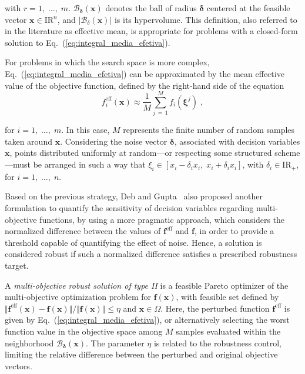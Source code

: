 \documentclass[final,5p,times,twocolumn,numbers]{elsarticle}
\newcommand{\vect}[1]{\mathbf{\boldsymbol{#1}}}
\begin{document}
\noindent with $ r = 1, \; \dots, \; m $. $ \mathcal{B}_{\vect{\delta}} \left( \mathbf{x} \right) $ denotes the ball of radius $ \vect{\delta} $ centered at the feasible vector $ \mathbf{x} \in \mathrm{I\!R}^{n} $, and $ \vert \mathcal{B}_{\delta} \left( \mathbf{x} \right) \vert $ is its hypervolume. This definition, also referred to in the literature as effective mean, is appropriate for problems with a closed-form solution to Eq.~(\ref{eq:integral_media_efetiva}). 

For problems in which the search space is more complex, Eq.~(\ref{eq:integral_media_efetiva}) can be approximated by the mean effective value of the objective function, defined by the right-hand side of the equation
%
\begin{equation*}
f_{i}^{\mathrm{eff}} \left( \mathbf{x} \right) \approx \dfrac{1}{M} \sum\limits_{j \, = \, 1}^{M} f_{i} \left( \vect{\xi}^{j} \right) \; ,
\end{equation*}

\noindent for $ i = 1, \; \dots, \; m $. In this case, $ M $ represents the finite number of random samples taken around $ \mathbf{x} $. Considering the noise vector $ \vect{\delta} $, associated with decision variables $ \mathbf{x} $, points distributed uniformly at random---or respecting some structured scheme---must be arranged in such a way that $ \xi_{i} \in \left[ x_{i} - \delta_{i} x_{i}, \; x_{i} + \delta_{i} x_{i} \right] $, with $ \delta_{i} \in \mathrm{I\!R}_{+} $, for $ i = 1, \; \dots, \; n $.

Based on the previous strategy, Deb and Gupta~\cite{bib:deb2005} also proposed another formulation to quantify the sensitivity of decision variables regarding multi-objective functions, by using a more pragmatic approach, which considers the normalized difference between the values of $ \mathbf{f}^{\mathrm{eff}} $ and $ \mathbf{f} $, in order to provide a threshold capable of quantifying the effect of noise. Hence, a solution is considered robust if such a normalized difference satisfies a prescribed robustness target.

A \textit{multi-objective robust solution of type II} is a feasible Pareto optimizer of the multi-objective optimization problem for $ \mathbf{f} \left( \mathbf{x} \right) $, with feasible set defined by $ \Vert \mathbf{f}^{\mathrm{eff}} \left( \mathbf{x} \right) - \mathbf{f} \left( \mathbf{x} \right) \Vert / \Vert \mathbf{f} \left( \mathbf{x} \right) \Vert \leq \eta $ and $ \mathbf{x} \in \Omega $. Here, the perturbed function $ \mathbf{f}^{\mathrm{eff}} $ is given by Eq.~(\ref{eq:integral_media_efetiva}), or alternatively selecting the worst function value in the objective space among $ M $ samples evaluated within the neighborhood $ \mathcal{B}_{\vect{\delta}} \left( \mathbf{x} \right) $. The parameter $ \eta $ is related to the robustness control, limiting the relative difference between the perturbed and original objective vectors.
\end{document}
